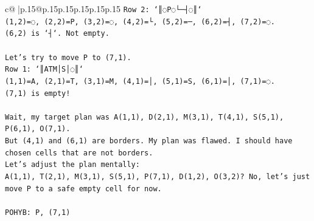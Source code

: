 \documentclass{article}
\begin{document}
{\begin{supertabular}{c@{$\;$}|p{.15\linewidth}@{}p{.15\linewidth}p{.15\linewidth}p{.15\linewidth}p{.15\linewidth}p{.15\linewidth}}
{{{\texttt{Row 2: `║◌P◌└─┤◌║`} \\
\texttt{(1,2)=◌, (2,2)=P, (3,2)=◌, (4,2)=└, (5,2)=─, (6,2)=┤, (7,2)=◌.} \\
\texttt{(6,2) is `┤`. Not empty.} \\
\\ 
\texttt{Let's try to move P to (7,1).} \\
\texttt{Row 1: `║ATM│S│◌║`} \\
\texttt{(1,1)=A, (2,1)=T, (3,1)=M, (4,1)=│, (5,1)=S, (6,1)=│, (7,1)=◌.} \\
\texttt{(7,1) is empty!} \\
\\ 
\texttt{Wait, my target plan was A(1,1), D(2,1), M(3,1), T(4,1), S(5,1), P(6,1), O(7,1).} \\
\texttt{But (4,1) and (6,1) are borders. My plan was flawed. I should have chosen cells that are not borders.} \\
\texttt{Let's adjust the plan mentally:} \\
\texttt{A(1,1), T(2,1), M(3,1), S(5,1), P(7,1), D(1,2), O(3,2)? No, let's just move P to a safe empty cell for now.} \\
\\ 
\texttt{POHYB: P, (7,1)} \\
            }
        }
    }
     \\ \\


\end{supertabular}}
\end{document}
